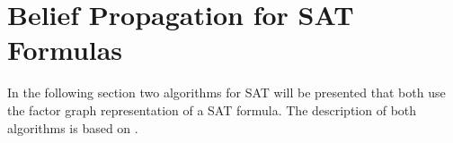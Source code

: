 \chapter{Belief Propagation for SAT Formulas}\label{BPFS}
In the following section two algorithms for SAT will be presented that both use the factor graph representation of a SAT formula. The description of both algorithms is based on \cite{dummizitat}.







